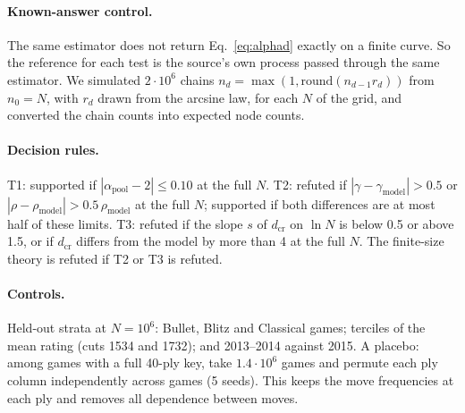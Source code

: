 \documentclass[11pt]{article}
\begin{document}
\paragraph{Known-answer control.} The same estimator does not return Eq.~\eqref{eq:alphad} exactly on a finite curve. So the reference for each test is the source's own process passed through the same estimator. We simulated $2\cdot10^6$ chains $n_d=\max(1,\mathrm{round}(n_{d-1}r_d))$ from $n_0=N$, with $r_d$ drawn from the arcsine law, for each $N$ of the grid, and converted the chain counts into expected node counts.

\paragraph{Decision rules.} T1: supported if $|\alpha_{\mathrm{pool}}-2|\le0.10$ at the full $N$. T2: refuted if $|\gamma-\gamma_{\mathrm{model}}|>0.5$ or $|\rho-\rho_{\mathrm{model}}|>0.5\,\rho_{\mathrm{model}}$ at the full $N$; supported if both differences are at most half of these limits. T3: refuted if the slope $s$ of $d_{\mathrm{cr}}$ on $\ln N$ is below 0.5 or above 1.5, or if $d_{\mathrm{cr}}$ differs from the model by more than 4 at the full $N$. The finite-size theory is refuted if T2 or T3 is refuted.

\paragraph{Controls.} Held-out strata at $N=10^6$: Bullet, Blitz and Classical games; terciles of the mean rating (cuts 1534 and 1732); and 2013--2014 against 2015. A placebo: among games with a full 40-ply key, take $1.4\cdot10^6$ games and permute each ply column independently across games (5 seeds). This keeps the move frequencies at each ply and removes all dependence between moves.
\end{document}
